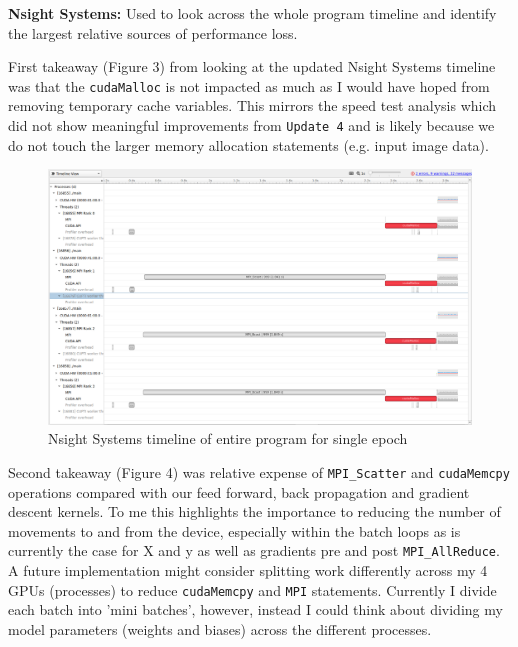 \documentclass[12pt,letterpaper,twoside]{article}
\begin{document}
\textbf{Nsight Systems:} Used to look across the whole program timeline and identify the
largest relative sources of performance loss.

First takeaway (Figure 3) from looking at the updated Nsight Systems timeline was that the
\texttt{cudaMalloc} is not impacted as much as I would have hoped from removing
temporary cache variables. This mirrors the speed test analysis which did not show
meaningful improvements from \texttt{Update 4} and is likely because we do not touch
the larger memory allocation statements (e.g. input image data).

\begin{figure}[!htbp]
    \centering
    \includegraphics[scale=0.3]{nsight_systems_overview2.png}
    \caption{Nsight Systems timeline of entire program for single epoch}
\end{figure}

Second takeaway (Figure 4) was relative expense of \texttt{MPI\_Scatter} and \texttt{cudaMemcpy}
operations compared with our feed forward, back propagation and gradient descent kernels.
To me this highlights the importance to reducing the number of movements to and from the
device, especially within the batch loops as is currently the case for X and y as well
as gradients pre and post \texttt{MPI\_AllReduce}. A future implementation might consider
splitting work differently across my 4 GPUs (processes) to reduce \texttt{cudaMemcpy} and
\texttt{MPI} statements. Currently I divide each batch into 'mini batches', however,
instead I could think about dividing my model parameters (weights and biases) across
the different processes.
\end{document}
